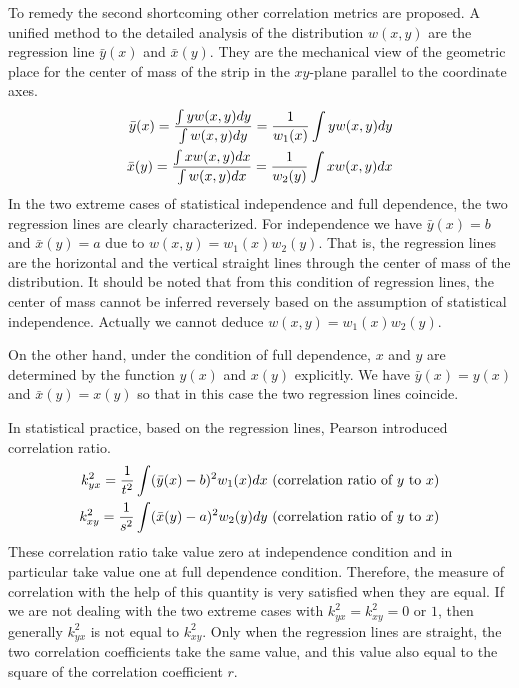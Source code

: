 \documentclass{article}
\begin{document}
To remedy the second shortcoming other correlation metrics are proposed.
A unified method to the detailed analysis of the distribution $w(x,y)$ are the regression line $\bar{y}(x)$ and $\bar{x}(y)$.
They are the mechanical view of the geometric place for the center of mass of the strip in
the $xy$-plane parallel to the coordinate axes.
\begin{align}
   \bar{y}(x) = \frac{\int y w(x,y) dy}{\int w(x,y) dy} = \frac{1}{w_1(x)} \int y w(x, y)dy \notag \\
   \bar{x}(y) =  \frac{\int x w(x,y) dx}{\int w(x,y) dx} = \frac{1}{w_2(y)} \int x w(x, y)dx  \label{eq:barxy}
\end{align}
In the two extreme cases of statistical independence and
full dependence, the two regression lines are clearly
characterized. For independence we have $\bar{y}(x) = b$
and $\bar{x}(y)=a$ due to $w(x,y) = w_1(x)w_2(y)$.
That is, the regression lines are the horizontal and
the vertical straight lines through the center of mass of the
distribution. It should be noted that from this condition of regression lines,
the center of mass cannot be inferred reversely based on the assumption of statistical independence.
Actually we cannot deduce $w(x,y)=w_1(x)w_2(y)$.

On the other hand, under
the condition of full dependence, $x$ and
$y$ are determined by the function $y(x)$
and $x(y)$ explicitly. We have $\bar{y}(x) = y(x)$
and $\bar{x}(y) = x(y)$ so that in this case
the two regression lines coincide.

In statistical practice, based on the regression lines,
Pearson introduced \textsf{correlation ratio}.
\begin{align}
   k^2_{yx} = \frac{1}{t^2}\int (\bar{y}(x) - b)^2 w_1(x)dx \textrm{ (correlation ratio of $y$ to $x$}) \notag \\
   k^2_{xy} = \frac{1}{s^2}\int (\bar{x}(y) - a)^2 w_2(y)dy \textrm{ (correlation ratio of $y$ to $x$}) \label{eq:pr}
\end{align}
These correlation ratio take value zero at independence
condition and in particular take value one at full
dependence condition. Therefore, the measure of correlation with the help of this quantity is very satisfied when they are equal. If we are not dealing with the two extreme
cases with $k^2_{yx} = k^2_{xy}=0$ or $1$, then
generally $k^2_{yx}$ is not equal to $k^2_{xy}$. Only when the regression lines are straight, the two correlation coefficients take the same value, and this
value also equal to the square of the correlation
coefficient $r$.
\end{document}
